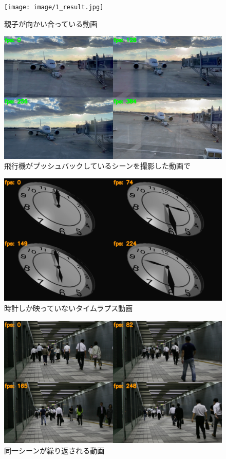 \documentclass[a4j,12pt,dvipdfmx]{jreport}
\begin{document}
\begin{figure}[H]
  \centering
  \texttt{[image: image/1\_result.jpg]}
  \caption{親子が向かい合っている動画}
  \label{fig:movie1}
\end{figure}

\begin{figure}[H]
  \centering
  \includegraphics[width=13cm]{image/2_result.jpg}
  \caption{飛行機がプッシュバックしているシーンを撮影した動画で}
  \label{fig:movie2}
\end{figure}

\begin{figure}[H]
  \centering
  \includegraphics[width=13cm]{image/3_result.jpg}
  \caption{時計しか映っていないタイムラプス動画}
  \label{fig:movie3}
\end{figure}

\begin{figure}[H]
  \centering
  \includegraphics[width=13cm]{image/4_result.jpg}
  \caption{同一シーンが繰り返される動画}
  \label{fig:movie4}
\end{figure}
\end{document}
